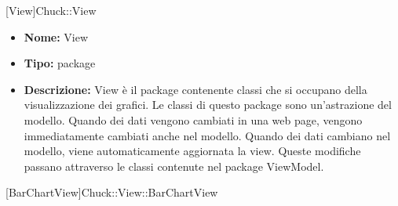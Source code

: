 			
			[View]{Chuck::View}
			

	

			\begin{itemize}
			\item \textbf{Nome:} View
			\item \textbf{Tipo:} package
			
			\item \textbf{Descrizione:} View è il package contenente classi che si occupano della visualizzazione dei grafici.  Le classi di questo package sono un'astrazione del modello. Quando dei dati vengono cambiati in una web page, vengono immediatamente cambiati anche nel modello. Quando dei dati cambiano nel modello, viene automaticamente aggiornata la view. Queste modifiche passano attraverso le classi contenute nel package ViewModel. 
			\end{itemize}

			
			[BarChartView]{Chuck::View::BarChartView}
			

	
